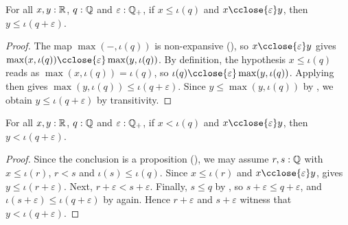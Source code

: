 \begin{lemma}
  \label{leRatCloseLeRatPlusReal}
  For all $x, y : \mathbb{R}$, $q : \mathbb{Q}$ and $\varepsilon : \mathbb{Q}_{+}$, if $x \le \iota(q)$ and $x \cclose{\varepsilon} y$, then $y \le \iota(q + \varepsilon)$.
\end{lemma}
\begin{proof}
  The map $\max(-, \iota(q))$ is non-expansive (), so $x \cclose{\varepsilon} y$ gives $\max(x, \iota(q)) \cclose{\varepsilon} \max(y, \iota(q))$. By definition, the hypothesis $x \le \iota(q)$ reads as $\max(x, \iota(q)) = \iota(q)$, so $\iota(q) \cclose{\varepsilon} \max(y, \iota(q))$. Applying  then gives $\max(y, \iota(q)) \le \iota(q + \varepsilon)$. Since $y \le \max(y, \iota(q))$ by , we obtain $y \le \iota(q + \varepsilon)$ by transitivity.
\end{proof}

\begin{lemma}
  \label{ltRatCloseLtRatPlusReal}
  For all $x, y : \mathbb{R}$, $q : \mathbb{Q}$ and $\varepsilon : \mathbb{Q}_{+}$, if $x < \iota(q)$ and $x \cclose{\varepsilon} y$, then $y < \iota(q + \varepsilon)$.
\end{lemma}
\begin{proof}
  Since the conclusion is a proposition (), we may assume $r, s : \mathbb{Q}$ with $x \le \iota(r)$, $r < s$ and $\iota(s) \le \iota(q)$. Since $x \le \iota(r)$ and $x \cclose{\varepsilon} y$,  gives $y \le \iota(r + \varepsilon)$. Next, $r + \varepsilon < s + \varepsilon$. Finally, $s \le q$ by , so $s + \varepsilon \le q + \varepsilon$, and $\iota(s + \varepsilon) \le \iota(q + \varepsilon)$ by  again. Hence $r + \varepsilon$ and $s + \varepsilon$ witness that $y < \iota(q + \varepsilon)$.
\end{proof}
